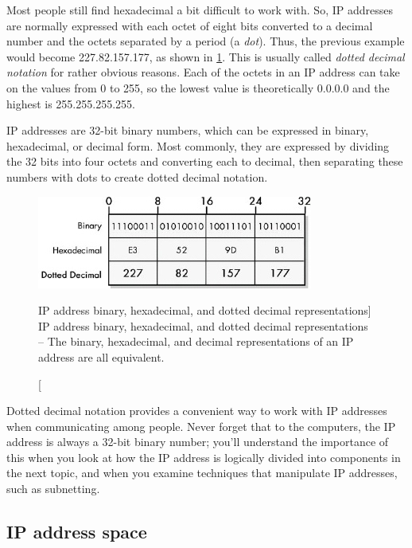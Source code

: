 Most people still find hexadecimal a bit difficult to work with.
So, IP addresses are normally expressed with each octet of eight bits converted to a
decimal number and the octets separated by a period (a \emph{dot}).
Thus, the previous example would become 227.82.157.177, as shown in \cref{fig:ip-address-notation}.
This is usually called {\emph{dotted decimal notation}} for rather
obvious reasons. Each of the octets in an IP address can take on the
values from 0 to 255, so the lowest value is theoretically 0.0.0.0 and
the highest is 255.255.255.255.

\begin{keyconcept}
IP addresses are 32-bit binary numbers, which can be expressed in binary, hexadecimal, or decimal form.
Most commonly, they are expressed by dividing the 32 bits into four octets and converting each to decimal, then separating these numbers with dots to create dotted decimal notation.
\end{keyconcept}


\begin{figure}
   \centering
   \includegraphics[width=.7\textwidth]{images/ip-address-notation.jpg}
   \caption
      [IP address binary, hexadecimal, and dotted decimal representations]
      {IP address binary, hexadecimal, and dotted decimal representations -- The binary, hexadecimal, and decimal representations of an IP address are all equivalent.}
   \label{fig:ip-address-notation}
\end{figure}

Dotted decimal notation provides a convenient way to work with IP addresses when communicating among people.
Never forget that to the computers, the IP address is always a 32-bit binary
number; you'll understand the importance of this when you look at how
the IP address is logically divided into components in the next topic,
and when you examine techniques that manipulate IP addresses, such as
subnetting.



\subsection{IP address space}

